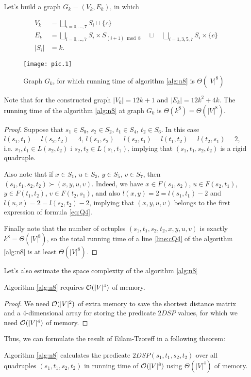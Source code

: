 \begin{theorem}
Let's build a graph $G_k = (V_k, E_k)$, in which

\begin{align}
V_k &= \bigsqcup\limits_{i = 0,\ldots,7} S_i \sqcup \{c\} \\
E_k &= \bigsqcup\limits_{i = 0,\ldots,7} S_i \times S_{(i+1) \bmod 8} \quad\sqcup\quad \bigsqcup\limits_{i=1,3,5,7} S_i \times \{c\} \\
|S_i| &= k.
\end{align}

\begin{figure}[H]
\caption{Graph $G_k$, for which running time of algorithm \ref{alg:n8} is $\Theta(|V|^8)$}
\centering
\texttt{[image: pic.1]}
\end{figure}

Note that for the constructed graph $|V_k| = 12k + 1$ and $|E_k| = 12k^2 + 4k$. The running time of the algorithm \ref{alg:n8} at graph $G_k$ is $\Theta(k^8) = \Theta(|V|^8)$.

\end{theorem}
\begin{proof}
Suppose that $s_1 \in S_0$, $s_2 \in S_2$, $t_1 \in S_4$, $t_2 \in S_6$. In this case $l(s_1, t_1) = l(s_2, t_2) = 4$, $l(s_1, s_2) = l(s_2, t_1) = l(t_1, t_2) = l(t_2, s_1) = 2$, i.e. $s_1, t_1 \in L(s_2, t_2)$ i $s_2, t_2 \in L(s_1, t_1)$, implying that $(s_1, t_1, s_2, t_2)$ is a rigid quadruple.

Also note that if $x \in S_1$, $u \in S_3$, $y \in S_5$, $v \in S_7$, then $(s_1, t_1, s_2, t_2) \succ (x, y, u, v)$. Indeed, we have $x \in F(s_1, s_2)$, $u \in F(s_2, t_1)$, $y \in F(t_1, t_2)$, $v \in F(t_2, s_1)$, and also $l(x, y) = 2 = l(s_1, t_1) - 2$ and $l(u, v) = 2 = l(s_2, t_2) - 2$, implying that $(x, y, u, v)$ belongs to the first expression of formula \ref{eq:Q4}.

Finally note that the number of octuples $(s_1, t_1, s_2, t_2, x, y, u, v)$ is exactly $k^8 = \Theta(|V|^8)$, so the total running time of a line \ref{line:cQ4} of the algorithm \ref{alg:n8} is at least $\Theta(|V|^8)$.
\end{proof}

Let's also estimate the space complexity of the algorithm \ref{alg:n8}
\begin{theorem}
Algorithm \ref{alg:n8} requires $\mathcal{O}(|V|^4)$ of memory.
\end{theorem}
\begin{proof}
We need $\mathcal{O}(|V|^2)$ of extra memory to save the shortest distance matrix and a 4-dimensional array for storing the predicate $2DSP$ values, for which we need $\mathcal{O}(|V|^4)$ of memory.
\end{proof}

Thus, we can formulate the result of Eilam-Tzoreff in a following theorem: 

\begin{theorem} 
Algorithm \ref{alg:n8} calculates the predicate $2DSP(s_1, t_1, s_2, t_2)$ over all quadruples $(s_1, t_1, s_2, t_2)$ in running time of $\mathcal{O}(|V|^8)$ using $\Theta(|V|^4)$ of memory. 
\end{theorem}
